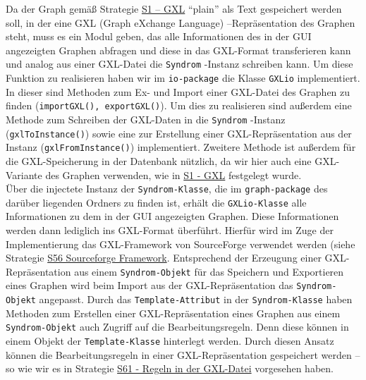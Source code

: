 \documentclass[enabledeprecatedfontcommands,fontsize=11pt,paper=a4,twoside]{scrartcl}
\newcounter{one}
\begin{document}
Da der Graph gemäß Strategie \hyperlink{yy}{S1 – GXL} "`plain"' als Text gespeichert werden soll, in der eine GXL (Graph eXchange Language) –Repräsentation des Graphen steht, muss es ein Modul geben, das alle Informationen des in der GUI angezeigten Graphen abfragen und diese in das GXL-Format transferieren kann und analog aus einer GXL-Datei die \texttt{Syndrom} -Instanz schreiben kann. Um diese Funktion zu realisieren haben wir im \texttt{io-package} die Klasse \texttt{GXLio} implementiert. \\
In dieser sind Methoden zum Ex- und Import einer GXL-Datei des Graphen zu finden (\texttt{importGXL(), exportGXL()}). Um dies zu realisieren sind außerdem eine Methode zum Schreiben der GXL-Daten in die \texttt{Syndrom} -Instanz (\texttt{gxlToInstance()}) sowie eine zur Erstellung einer GXL-Repräsentation aus der Instanz (\texttt{gxlFromInstance()}) implementiert. Zweitere Methode ist außerdem für die GXL-Speicherung in der Datenbank nützlich, da wir hier auch eine GXL-Variante des Graphen verwenden, wie in \hyperlink{yy}{S1 - GXL} festgelegt wurde.\\
Über die injectete Instanz der \texttt{Syndrom-Klasse}, die im \texttt{graph-package} des darüber liegenden Ordners zu finden ist, erhält die \texttt{GXLio-Klasse} alle Informationen zu dem in der GUI angezeigten Graphen. 
Diese Informationen werden dann lediglich ins GXL-Format überführt. Hierfür wird im Zuge der Implementierung das GXL-Framework von SourceForge verwendet werden (siehe Strategie \hyperlink{xaa}{S56 Sourceforge Framework}. Entsprechend der Erzeugung einer GXL-Repräsentation aus einem \texttt{Syndrom-Objekt} für das Speichern und Exportieren eines Graphen wird beim Import aus der GXL-Repräsentation das \texttt{Syndrom-Objekt} angepasst. Durch das \texttt{Template-Attribut} in der \texttt{Syndrom-Klasse} haben Methoden zum Erstellen einer GXL-Repräsentation eines Graphen aus einem \texttt{Syndrom-Objekt} auch Zugriff auf die Bearbeitungsregeln. Denn diese können in einem Objekt der \texttt{Template-Klasse} hinterlegt werden. Durch diesen Ansatz können die Bearbeitungsregeln in einer GXL-Repräsentation gespeichert werden – so wie wir es in Strategie \hyperlink{vvv}{S61 - Regeln in der GXL-Datei} vorgesehen haben. \\ \\
\end{document}
